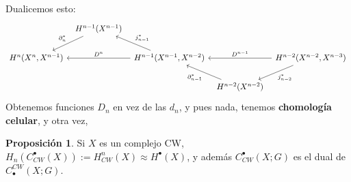 \documentclass[spanish]{book}
\theoremstyle{definition}
\newtheorem*{prop}{Proposición}
\begin{document}
Dualicemos esto:
\[\begin{tikzcd}[column sep=tiny]
	& H^{n-1}(X^{n-1})\arrow[ld,swap, "\partial^*_n"] \\
	H^n(X^n, X^{n-1})   && H^{n-1}(X^{n-1}, X^{n-2})\arrow[ll,swap, "D^n"]\arrow[lu,swap, "j^*_{n-1}"]  && H^{n-2}(X^{n-2}, X^{n-3})  \arrow[ld, "j^*_{n-2}"]\arrow[ll,swap, "D^{n-1}"] \\
	& && H^{n-2}(X^{n-2})\arrow[lu, "\partial^*_{n-1}"]
\end{tikzcd}\]
Obtenemos funciones $D_n$ en vez de las $d_n$, y pues nada, tenemos \textbf{chomología celular}, y otra vez,
\begin{prop}
	 Si $X$ es un complejo CW, $H_n(C_{CW}^\bullet(X)):=H_{CW}^n(X)\approx H^\bullet(X)$, y además $C_{CW}^\bullet(X;G)$ es el dual de $C_\bullet^{CW}(X;G)$.
\end{prop}
\end{document}

